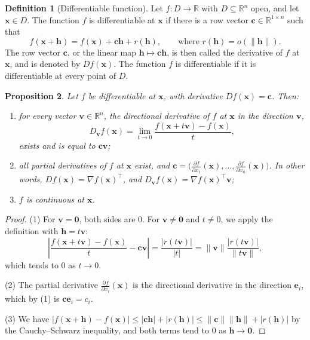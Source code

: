 \documentclass[11pt]{article}
\newcommand{\norm}[1]{\lVert #1 \rVert}
\theoremstyle{definition}
\newtheorem{definition}{Definition}[section]
\theoremstyle{plain}
\newtheorem{proposition}[definition]{Proposition}
\theoremstyle{remark}
\begin{document}
\begin{definition}[Differentiable function]\label{def:differentiable}
    Let $f: D \to \mathbb{R}$ with $D \subseteq \mathbb{R}^n$ open, and let $\mathbf{x} \in D$. The function $f$ is differentiable at $\mathbf{x}$ if there is a row vector $\mathbf{c} \in \mathbb{R}^{1 \times n}$ such that
    \[f(\mathbf{x} + \mathbf{h}) = f(\mathbf{x}) + \mathbf{c}\mathbf{h} + r(\mathbf{h}), \qquad \text{where } r(\mathbf{h}) = o(\norm{\mathbf{h}}).\]
    The row vector $\mathbf{c}$, or the linear map $\mathbf{h} \mapsto \mathbf{c}\mathbf{h}$, is then called the derivative of $f$ at $\mathbf{x}$, and is denoted by $Df(\mathbf{x})$. The function $f$ is differentiable if it is differentiable at every point of $D$.
\end{definition}

\begin{proposition}\label{prop:differentiable}
    Let $f$ be differentiable at $\mathbf{x}$, with derivative $Df(\mathbf{x}) = \mathbf{c}$. Then:
    \begin{enumerate}
        \item for every vector $\mathbf{v} \in \mathbb{R}^n$, the directional derivative of $f$ at $\mathbf{x}$ in the direction $\mathbf{v}$,
        \[D_{\mathbf{v}} f(\mathbf{x}) = \lim_{t \to 0} \frac{f(\mathbf{x} + t\mathbf{v}) - f(\mathbf{x})}{t},\]
        exists and is equal to $\mathbf{c}\mathbf{v}$;
        \item all partial derivatives of $f$ at $\mathbf{x}$ exist, and $\mathbf{c} = \big(\frac{\partial f}{\partial x_1}(\mathbf{x}), \ldots, \frac{\partial f}{\partial x_n}(\mathbf{x})\big)$. In other words, $Df(\mathbf{x}) = \nabla f(\mathbf{x})^\top$, and $D_{\mathbf{v}} f(\mathbf{x}) = \nabla f(\mathbf{x})^\top \mathbf{v}$;
        \item $f$ is continuous at $\mathbf{x}$.
    \end{enumerate}
\end{proposition}

\begin{proof}
    (1) For $\mathbf{v} = \mathbf{0}$, both sides are $0$. For $\mathbf{v} \neq \mathbf{0}$ and $t \neq 0$, we apply the definition with $\mathbf{h} = t\mathbf{v}$:
    \[\left| \frac{f(\mathbf{x} + t\mathbf{v}) - f(\mathbf{x})}{t} - \mathbf{c}\mathbf{v} \right| = \frac{|r(t\mathbf{v})|}{|t|} = \norm{\mathbf{v}} \frac{|r(t\mathbf{v})|}{\norm{t\mathbf{v}}},\]
    which tends to $0$ as $t \to 0$.

    (2) The partial derivative $\frac{\partial f}{\partial x_i}(\mathbf{x})$ is the directional derivative in the direction $\mathbf{e}_i$, which by (1) is $\mathbf{c}\mathbf{e}_i = c_i$.

    (3) We have $|f(\mathbf{x} + \mathbf{h}) - f(\mathbf{x})| \leq |\mathbf{c}\mathbf{h}| + |r(\mathbf{h})| \leq \norm{\mathbf{c}} \norm{\mathbf{h}} + |r(\mathbf{h})|$ by the Cauchy--Schwarz inequality, and both terms tend to $0$ as $\mathbf{h} \to \mathbf{0}$.
\end{proof}
\end{document}
